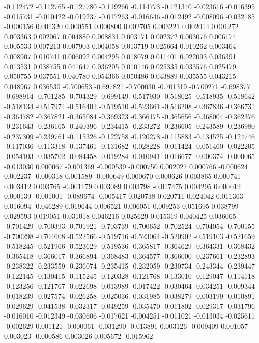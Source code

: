 -0.112472
-0.112765
-0.127780
-0.119266
-0.114773
-0.121340
-0.023616
-0.016395
-0.015731
-0.010422
-0.019237
-0.017263
-0.016646
-0.012492
-0.008096
-0.032185
-0.000156
0.001320
0.000551
0.000800
0.002705
0.003221
0.002014
0.001272
0.003363
0.002067
0.004880
0.008831
0.003171
0.002372
0.003076
0.006174
0.005533
0.007213
0.007903
0.004058
0.013719
0.025664
0.010262
0.003464
0.008907
0.010741
0.006092
0.004295
0.018079
0.011401
0.022093
0.036391
0.013531
0.038755
0.041647
0.036205
0.010146
0.025335
0.033576
0.025479
0.050755
0.037551
0.040780
0.054366
0.050486
0.043889
0.035555
0.043215
0.048967
0.036530
-0.700653
-0.697821
-0.700030
-0.701319
-0.700271
-0.698377
-0.698914
-0.701285
-0.704329
-0.699149
-0.517930
-0.518025
-0.518935
-0.518642
-0.518134
-0.517974
-0.516402
-0.519510
-0.523661
-0.516208
-0.367836
-0.366731
-0.364782
-0.367821
-0.365084
-0.369323
-0.366175
-0.365656
-0.368004
-0.362376
-0.231643
-0.236165
-0.240396
-0.234415
-0.233272
-0.236605
-0.243589
-0.236980
-0.237309
-0.239761
-0.115326
-0.122758
-0.120278
-0.115883
-0.134525
-0.124746
-0.117036
-0.113318
-0.137461
-0.131682
-0.028228
-0.011424
-0.051460
-0.022205
-0.054103
-0.035702
-0.084458
-0.019284
-0.010941
-0.016677
-0.000374
-0.000065
-0.013030
0.000067
-0.001369
-0.000539
-0.000750
0.002027
0.000766
-0.000624
0.002237
-0.000318
0.001589
-0.000649
0.000670
0.000626
0.003865
0.000741
0.003412
0.003765
-0.001179
0.003089
0.003798
-0.017475
0.004295
0.000012
0.000139
-0.001001
-0.089674
-0.005417
0.020738
0.020711
0.024042
0.011363
0.016094
-0.046289
0.019644
0.006521
0.006051
0.009253
0.051695
0.038799
0.029593
0.019051
0.031018
0.046216
0.025629
0.015319
0.040425
0.036065
-0.701429
-0.700393
-0.701921
-0.703739
-0.700652
-0.702524
-0.704054
-0.700155
-0.700298
-0.704608
-0.522566
-0.519716
-0.523064
-0.520902
-0.519103
-0.521659
-0.518245
-0.521966
-0.523629
-0.519536
-0.365817
-0.364629
-0.364331
-0.368432
-0.365418
-0.366017
-0.366894
-0.368483
-0.364577
-0.366000
-0.237661
-0.232893
-0.238322
-0.233559
-0.236074
-0.235415
-0.232059
-0.230734
-0.243344
-0.239447
-0.122145
-0.130415
-0.115245
-0.120328
-0.121768
-0.133010
-0.129047
-0.114118
-0.123256
-0.121767
-0.022698
-0.013989
-0.017422
-0.030464
-0.034251
-0.009344
-0.018239
-0.027574
-0.026258
-0.025036
-0.031985
-0.038279
-0.003199
-0.010891
-0.029629
-0.041538
-0.032317
-0.049259
-0.035470
-0.011802
-0.029317
-0.031796
-0.016010
-0.012349
-0.030606
-0.017621
-0.004251
-0.011021
-0.013034
-0.025611
-0.002629
0.001121
-0.000061
-0.031290
-0.013891
0.003126
-0.009409
0.001057
0.003023
-0.000586
0.003026
0.005672
-0.015962
